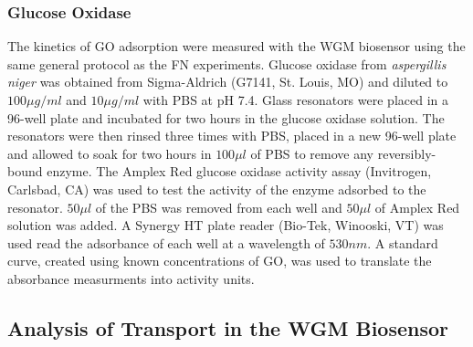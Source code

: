 \subsubsection{Glucose Oxidase}

The kinetics of GO adsorption were measured with the WGM biosensor
using the same general protocol as the FN experiments. Glucose oxidase
from \emph{aspergillis niger} was obtained from Sigma-Aldrich (G7141,
St. Louis, MO) and diluted to $100\mu g/ml$ and $10\mu g/ml$ with
PBS at pH 7.4. Glass resonators were placed in a 96-well plate and
incubated for two hours in the glucose oxidase solution. The resonators
were then rinsed three times with PBS, placed in a new 96-well plate
and allowed to soak for two hours in $100\mu l$ of PBS to remove
any reversibly-bound enzyme. The Amplex Red glucose oxidase activity
assay (Invitrogen, Carlsbad, CA) was used to test the activity of
the enzyme adsorbed to the resonator. $50\mu l$ of the PBS was removed
from each well and $50\mu l$ of Amplex Red solution was added. A
Synergy HT plate reader (Bio-Tek, Winooski, VT) was used read the
adsorbance of each well at a wavelength of $530nm$. A standard curve,
created using known concentrations of GO, was used to translate the
absorbance measurments into activity units.


\subsection{Analysis of Transport in the WGM Biosensor}

